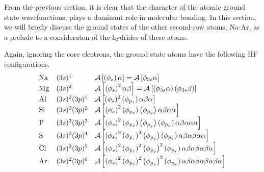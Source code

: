 From the previous section, it is clear that the character of the 
atomic ground state wavefunctions, plays a dominant role in molecular 
bonding.  In this section, we will briefly discuss the ground states 
of the other second-row atoms, Na-Ar, as a prelude to a consideraton 
of the hydrides of these atoms.

Again, ignoring the core electrons, the ground state atoms have the 
following HF configurations.  
\begin{equation}
\begin{array}{lll}
\mathrm{Na} & (3s)^1 & 
{\cal A} \left[ \left( \phi_s \right) \alpha \right] = 
{\cal A} \left[ \phi_{3s} \alpha \right] \\
\mathrm{Mg} & (3s)^2 &
{\cal A} \left[ \left( \phi_s \right)^2 \alpha \beta 
\right] = {\cal A} \left[ \left( \phi_{3s} \alpha \right) 
\left( \phi_{3s} \beta \right) \right] \\
\mathrm{Al} & (3s)^2 (3p)^1 &
{\cal A} \left[ ( \phi_s )^2 \left( \phi_{p_z} 
\right) \alpha \beta \alpha \right] \\
\mathrm{Si} & (3s)^2 (3p)^2 &
{\cal A} \left[ \left( \phi_s \right)^2 \left( 
\phi_{p_z} \right) \left( \phi_{p_y} \right) \alpha \beta \alpha 
\alpha \right] \\
\mathrm{P} &(3s)^2 (3p)^3 &
{\cal A} \left[ \left( \phi_s \right)^2 \left( 
\phi_{p_z} \right) \left( \phi_{p_y} \right) \left( \phi_{p_x} 
\right) \alpha \beta \alpha \alpha \alpha \right]\\
\mathrm{S} & (3s)^2 (3p)^4 &
{\cal A} \left[ \left( \phi_s \right)^2 \left( 
\phi_{p_z} \right)^2 \left( \phi_{p_y} \right) \left( \phi_{p_x} 
\right) \alpha \beta \alpha \beta \alpha \alpha \right] \\
\mathrm{Cl} & (3s)^2 (3p)^5 &
 {\cal A} \left[ \left( \phi_s \right)^2 \left( 
\phi_{p_z} \right)^2 \left( \phi_{p_y} \right)^2 \left( \phi_{p_x} 
\right) \alpha \beta \alpha \beta \alpha \beta \alpha \right] \\
\mathrm{Ar} & (3s)^2 (3p)^6 &
 {\cal A} \left[ \left( \phi_s \right)^2 \left( 
\phi_{p_z} \right)^2 \left( \phi_{p_y} \right)^2 \left( \phi_{p_x} 
\right) \alpha \beta \alpha \beta \alpha \beta \alpha \beta \alpha
\right] \\
\end{array}
\end{equation}

